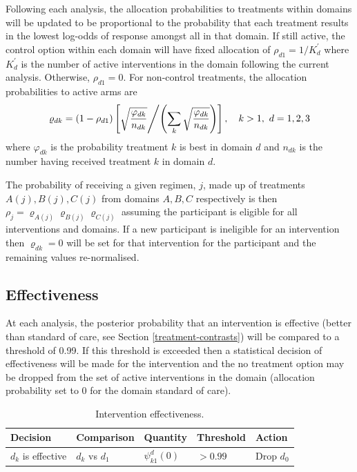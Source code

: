 \documentclass[
  11pt,
]{article}
\begin{document}
Following each analysis, the allocation probabilities to treatments within domains will be updated to be proportional to the probability that each treatment results in the lowest log-odds of response amongst all in that domain.
If still active, the control option within each domain will have fixed allocation of \(\rho_{d1}=1/K_d^\prime\) where \(K_d^\prime\) is the number of active interventions in the domain following the current analysis. Otherwise, \(\rho_{d1}=0\).
For non-control treatments, the allocation probabilities to active arms are
\[
\varrho_{dk} = (1-\rho_{d1})\left[\sqrt{\frac{\varphi_{dk}}{n_{dk}}} \middle /\left(\sum_{k}\sqrt{\frac{\varphi_{dk}}{n_{dk}}}\right)\right],\quad k>1,\ d=1,2,3
\]
where \(\varphi_{dk}\) is the probability treatment \(k\) is best in domain \(d\) and \(n_{dk}\) is the number having received treatment \(k\) in domain \(d\).

The probability of receiving a given regimen, \(j\), made up of treatments \(A(j),B(j),C(j)\) from domains \(A,B,C\) respectively is then \(\rho_j=\varrho_{A(j)}\varrho_{B(j)}\varrho_{C(j)}\) assuming the participant is eligible for all interventions and domains. If a new participant is ineligible for an intervention then \(\varrho_{dk}=0\) will be set for that intervention for the participant and the remaining values re-normalised.

\hypertarget{effectiveness}{%
\subsection{Effectiveness}\label{effectiveness}}

At each analysis, the posterior probability that an intervention is effective (better than standard of care, see Section \ref{treatment-contrasts}) will be compared to a threshold of 0.99.
If this threshold is exceeded then a statistical decision of effectiveness will be made for the intervention and the no treatment option may be dropped from the set of active interventions in the domain (allocation probability set to 0 for the domain standard of care).

\begin{table}[H]

\caption{\label{tab:unnamed-chunk-2}Intervention effectiveness.}
\centering
\begin{tabular}[t]{lllll}
\toprule
Decision & Comparison & Quantity & Threshold & Action\\
\midrule
$d_k$ is effective & $d_k$ vs $d_1$ & $\psi_{k1}^d(0)$ & $>0.99$ & Drop $d_0$\\
\bottomrule
\end{tabular}
\end{table}
\end{document}
